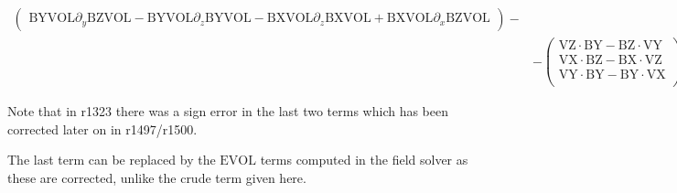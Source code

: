 \documentclass[a4paper,10pt]{article}
\begin{document}
\begin{align}
\begin{pmatrix}
      \textrm{BYVOL}\partial_y\textrm{BZVOL} - \textrm{BYVOL}\partial_z\textrm{BYVOL} - \textrm{BXVOL}\partial_z\textrm{BXVOL} + \textrm{BXVOL}\partial_x\textrm{BZVOL}
   \end{pmatrix}
   - \\
   &- \begin{pmatrix}
      \textrm{VZ}\cdot\textrm{BY} - \textrm{BZ}\cdot\textrm{VY} \\
      \textrm{VX}\cdot\textrm{BZ} - \textrm{BX}\cdot\textrm{VZ} \\
      \textrm{VY}\cdot\textrm{BY} - \textrm{BY}\cdot\textrm{VX} \\
   \end{pmatrix}
   + \frac{1}{\textrm{RHO}}
   \begin{pmatrix}
      \textrm{BY}\cdot\textrm{RHOVZ} - \textrm{BZ}\cdot\textrm{RHOVY} \\
      \textrm{BZ}\cdot\textrm{RHOVX} - \textrm{BX}\cdot\textrm{RHOVZ} \\
      \textrm{BX}\cdot\textrm{RHOVY} - \textrm{BY}\cdot\textrm{RHOVX}.
   \end{pmatrix}
\end{align}

Note that in r1323 there was a sign error in the last two terms which has been corrected later on in r1497/r1500.

The last term can be replaced by the $\textrm{EVOL}$ terms computed in the field solver as these are corrected, unlike the crude term given here.
\end{document}
